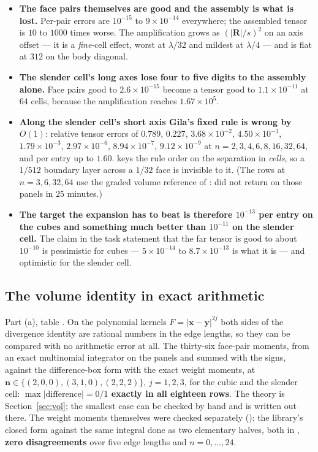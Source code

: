 \begin{itemize}[nosep,leftmargin=1.4em]
\item \textbf{The face pairs themselves are good and the assembly is what is lost.} Per-pair
errors are $10^{-15}$ to $9\times10^{-14}$ everywhere; the assembled tensor is $10$ to
$1000$ times worse. The amplification grows as $(|\mathbf{R}|/s)^2$ on an axis offset --- it
is a \emph{fine}-cell effect, worst at $\lambda/32$ and mildest at $\lambda/4$ --- and is
flat at $312$ on the body diagonal.
\item \textbf{The slender cell's long axes lose four to five digits to the assembly alone.}
Face pairs good to $2.6\times10^{-15}$ become a tensor good to $1.1\times10^{-11}$ at
$64$ cells, because the amplification reaches $1.67\times10^{5}$.
\item \textbf{Along the slender cell's short axis Gila's fixed rule is wrong by $O(1)$}:
relative tensor errors of $0.789$, $0.227$, $3.68\times10^{-2}$, $4.50\times10^{-3}$,
$1.79\times10^{-3}$, $2.97\times10^{-6}$, $8.94\times10^{-7}$, $9.12\times10^{-9}$ at
$n = 2,3,4,6,8,16,32,64$, and per entry up to $1.60$.  keys the rule order on
the separation in \emph{cells}, so a $1/512$ boundary layer across a $1/32$ face is
invisible to it. (The rows at $n = 3, 6, 32, 64$ use the graded volume reference of
:  did not return on those panels in $25$ minutes.)
\item \textbf{The target the expansion has to beat is therefore $10^{-13}$ per entry on the
cubes and something much better than $10^{-11}$ on the slender cell.} The claim in the task
statement that the far tensor is good to about $10^{-10}$ is pessimistic for cubes ---
$5\times10^{-14}$ to $8.7\times10^{-13}$ is what it is --- and optimistic for the slender
cell.
\end{itemize}

\subsection{The volume identity in exact arithmetic}
\label{sec:grd:div}

Part (a), table . On the polynomial kernels $F = |\mathbf{x}-\mathbf{y}|^{2j}$
both sides of the divergence identity are rational numbers in the edge lengths, so they can
be compared with no arithmetic error at all. The thirty-six face-pair moments, from an exact
multinomial integrator on the  panels and summed with the 
signs, against the difference-box form with the exact weight moments, at
$\mathbf{n} \in \{(2,0,0),(3,1,0),(2,2,2)\}$, $j = 1,2,3$, for the cubic and the slender
cell: \textbf{$\max|\text{difference}| = 0/1$ exactly in all eighteen rows}. The theory is
Section~\ref{sec:vol}; the smallest case can be checked by hand and is written out there.
The weight moments themselves were checked separately (): the library's
closed form against the same integral done as two elementary halves, both in
, \textbf{zero disagreements} over five edge lengths and
$n = 0,\dots,24$.

